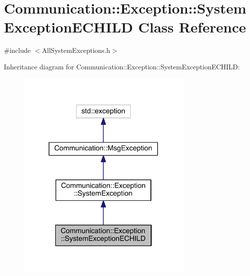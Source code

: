 \hypertarget{class_communication_1_1_exception_1_1_system_exception_e_c_h_i_l_d}{}\section{Communication\+:\+:Exception\+:\+:System\+Exception\+E\+C\+H\+I\+L\+D Class Reference}
\label{class_communication_1_1_exception_1_1_system_exception_e_c_h_i_l_d}


{\ttfamily \#include $<$All\+System\+Exceptions.\+h$>$}



Inheritance diagram for Communication\+:\+:Exception\+:\+:System\+Exception\+E\+C\+H\+I\+L\+D\+:\nopagebreak
\begin{figure}[H]
\begin{center}
\leavevmode
\includegraphics[width=248pt]{class_communication_1_1_exception_1_1_system_exception_e_c_h_i_l_d__inherit__graph}
\end{center}
\end{figure}


